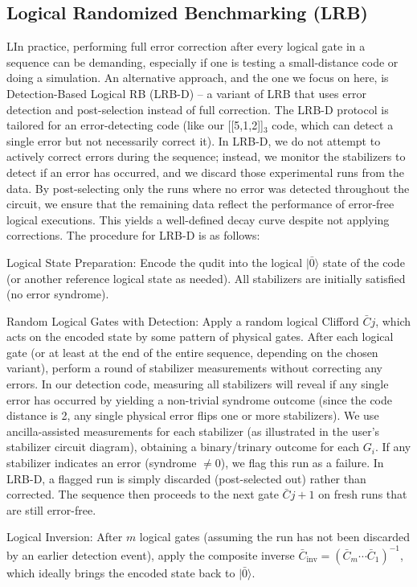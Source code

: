 \subsection{Logical Randomized Benchmarking (LRB)}
LIn practice, performing full error correction after every logical gate
in a sequence can be demanding, especially if one is testing a
small-distance code or doing a simulation. An alternative approach, and
the one we focus on here, is Detection-Based Logical RB (LRB-D) – a
variant of LRB that uses error detection and post-selection instead of
full correction.\cite{Harper2019FTIBM,Lacroix2025ColorCode} The LRB-D
protocol is tailored for an error-detecting code (like our [[5,1,2]]$_3$
code, which can detect a single error but not necessarily correct it).
In LRB-D, we do not attempt to actively correct errors during the
sequence; instead, we monitor the stabilizers to detect if an error has
occurred, and we discard those experimental runs from the data. By
post-selecting only the runs where no error was detected throughout the
circuit, we ensure that the remaining data reflect the performance of
error-free logical executions. This yields a well-defined decay curve
despite not applying corrections. The procedure for LRB-D is as follows:

Logical State Preparation: Encode the qudit into the logical
$|\bar{0}\rangle$ state of the code (or another reference logical state
as needed). All stabilizers are initially satisfied (no error syndrome).

Random Logical Gates with Detection: Apply a random logical Clifford
$\bar{C}j$, which acts on the encoded state by some pattern of physical
gates. After each logical gate (or at least at the end of the entire
sequence, depending on the chosen variant), perform a round of
stabilizer measurements without correcting any errors. In our detection
code, measuring all stabilizers will reveal if any single error has
occurred by yielding a non-trivial syndrome outcome (since the code
distance is 2, any single physical error flips one or more stabilizers).
We use ancilla-assisted measurements for each stabilizer (as
illustrated in the user’s stabilizer circuit diagram), obtaining a
binary/trinary outcome for each $G_i$. If any stabilizer indicates an
error (syndrome $\neq 0$), we flag this run as a failure. In LRB-D, a
flagged run is simply discarded (post-selected out) rather than
corrected. The sequence then proceeds to the next gate $\bar{C}{j+1}$ on
fresh runs that are still error-free.

Logical Inversion: After $m$ logical gates (assuming the run has not been
discarded by an earlier detection event), apply the composite inverse
$\bar{C}_{\text{inv}} = (\bar{C}_m \cdots \bar{C}_1)^{-1}$, which
ideally brings the encoded state back to $|\bar{0}\rangle$.


